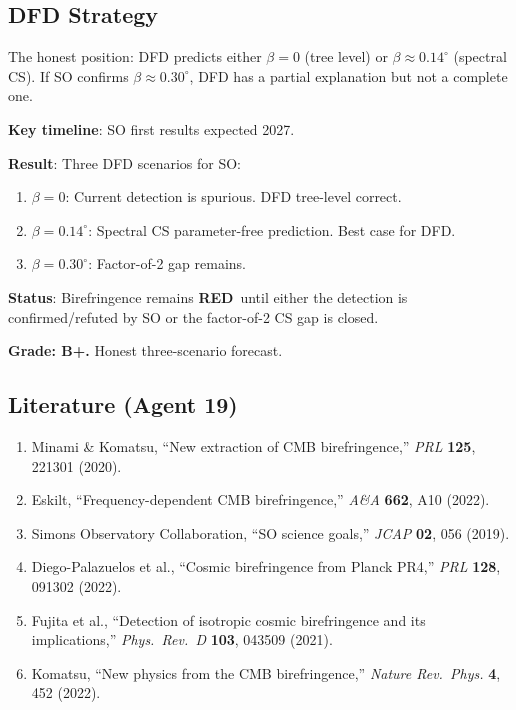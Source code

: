 \documentclass[11pt,a4paper]{article}
\newcommand{\RED}{\textcolor{dfdred}{\textbf{RED}}}
\begin{document}
\subsection{DFD Strategy}

The honest position: DFD predicts either $\beta = 0$ (tree level) or $\beta \approx 0.14^\circ$ (spectral CS). If SO confirms $\beta \approx 0.30^\circ$, DFD has a partial explanation but not a complete one.

\textbf{Key timeline}: SO first results expected 2027.

\begin{tcolorbox}[colback=blue!5!white, colframe=blue!60!black, title={Agent 19: Birefringence SO Forecast}]
\textbf{Result}: Three DFD scenarios for SO:
\begin{enumerate}
\item $\beta = 0$: Current detection is spurious. DFD tree-level correct.
\item $\beta = 0.14^\circ$: Spectral CS parameter-free prediction. Best case for DFD.
\item $\beta = 0.30^\circ$: Factor-of-2 gap remains.
\end{enumerate}

\textbf{Status}: Birefringence remains \RED\ until either the detection is confirmed/refuted by SO or the factor-of-2 CS gap is closed.

\textbf{Grade: B+.} Honest three-scenario forecast.
\end{tcolorbox}

\subsection{Literature (Agent 19)}

\begin{enumerate}
\item Minami \& Komatsu, ``New extraction of CMB birefringence,'' \textit{PRL} \textbf{125}, 221301 (2020).
\item Eskilt, ``Frequency-dependent CMB birefringence,'' \textit{A\&A} \textbf{662}, A10 (2022).
\item Simons Observatory Collaboration, ``SO science goals,'' \textit{JCAP} \textbf{02}, 056 (2019).
\item Diego-Palazuelos et al., ``Cosmic birefringence from Planck PR4,'' \textit{PRL} \textbf{128}, 091302 (2022).
\item Fujita et al., ``Detection of isotropic cosmic birefringence and its implications,'' \textit{Phys.\ Rev.\ D} \textbf{103}, 043509 (2021).
\item Komatsu, ``New physics from the CMB birefringence,'' \textit{Nature Rev.\ Phys.} \textbf{4}, 452 (2022).
\end{enumerate}
\end{document}
